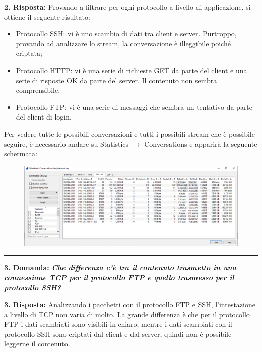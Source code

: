 \documentclass[a4paper]{article}
\newcommand{\longline}{\noindent\rule{\textwidth}{0.4pt}}
\begin{document}
	\noindent
	\textcolor{Green4}{\textbf{2. Risposta:}} Provando a filtrare per ogni protocollo a livello di applicazione, si ottiene il seguente risultato:
	\begin{itemize}
		\item Protocollo SSH: vi è uno scambio di dati tra client e server. Purtroppo, provando ad analizzare lo stream, la conversazione è illeggibile poiché criptata;
		
		\item Protocollo HTTP: vi è una serie di richieste GET da parte del client e una serie di risposte OK da parte del server. Il contenuto non sembra comprensibile;
		
		\item Protocollo FTP: vi è una serie di messaggi che sembra un tentativo da parte del client di login.
	\end{itemize}
	Per vedere tutte le possibili conversazioni e tutti i possibili stream che è possibile seguire, è necessario andare su \textsf{Statistics} $\rightarrow$ \textsf{Conversations} e apparirà la seguente schermata:
	\begin{figure}[!htp]
		\centering
		\includegraphics[width=\textwidth]{img/wireshark/ex2-6.png}
	\end{figure}
	
	\noindent \longline \newline
	
	\noindent
	\textcolor{Red3}{\textbf{3. Domanda:}} \textbf{\emph{Che differenza c'è tra il contenuto trasmetto in una connessione TCP per il protocollo FTP e quello trasmesso per il protocollo SSH?}}\newline
	
	\noindent
	\textcolor{Green4}{\textbf{3. Risposta:}} Analizzando i pacchetti con il protocollo FTP e SSH, l'intestazione a livello di TCP non varia di molto. La grande differenza è che per il protocollo FTP i dati scambiati sono visibili in chiaro, mentre i dati scambiati con il protocollo SSH sono criptati dal client e dal server, quindi non è possibile leggerne il contenuto.\newpage
	
\end{document}

